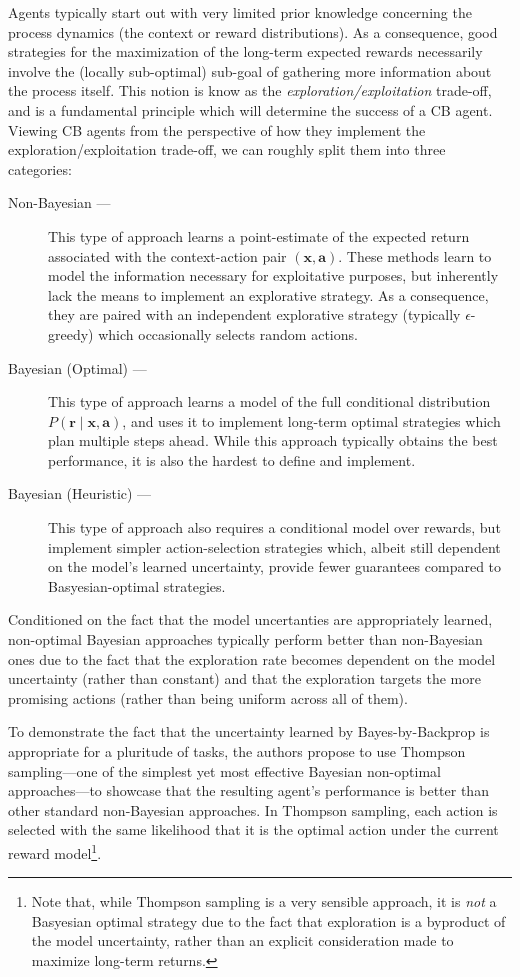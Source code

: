 \documentclass[11pt]{article}
\begin{document}
Agents typically start out with very limited prior knowledge concerning the
process dynamics (the context or reward distributions).  As a consequence, good
strategies for the maximization of the long-term expected rewards necessarily
involve the (locally sub-optimal) sub-goal of gathering more information about
the process itself.  This notion is know as the \emph{exploration/exploitation}
trade-off, and is a fundamental principle which will determine the success of
a CB agent.  Viewing CB agents from the perspective of how they implement the
exploration/exploitation trade-off, we can roughly split them into three
categories:
%
\begin{description}
  \item[Non-Bayesian ---]  This type of approach learns a point-estimate of the
    expected return associated with the context-action pair $(\bm x, \bm a)$.
    These methods learn to model the information necessary for exploitative
    purposes, but inherently lack the means to implement an explorative
    strategy.  As a consequence, they are paired with an independent
    explorative strategy (typically $\epsilon$-greedy) which occasionally
    selects random actions.
  \item[Bayesian (Optimal) ---]  This type of approach learns a model of the
    full conditional distribution $P(\bm r\mid \bm x, \bm a)$, and uses it to
    implement long-term optimal strategies which plan multiple steps ahead.
    While this approach typically obtains the best performance, it is also the
    hardest to define and implement.
  \item[Bayesian (Heuristic) ---]  This type of approach also requires
    a conditional model over rewards, but implement simpler action-selection
    strategies which, albeit still dependent on the model's learned uncertainty,
    provide fewer guarantees compared to Basyesian-optimal strategies.  
\end{description}

Conditioned on the fact that the model uncertanties are appropriately learned,
non-optimal Bayesian approaches typically perform better than non-Bayesian ones
due to the fact that the exploration rate becomes dependent on the model
uncertainty (rather than constant) and that the exploration targets the more
promising actions (rather than being uniform across all of them).

To demonstrate the fact that the uncertainty learned by Bayes-by-Backprop is
appropriate for a pluritude of tasks, the authors propose to use Thompson
sampling---one of the simplest yet most effective Bayesian non-optimal
approaches---to showcase that the resulting agent's performance is better than
other standard non-Bayesian approaches.  In Thompson sampling, each action is
selected with the same likelihood that it is the optimal action under the
current reward model\footnote{Note that, while Thompson sampling is a very
sensible approach, it is \emph{not} a Basyesian optimal strategy due to the
fact that exploration is a byproduct of the model uncertainty, rather than an
explicit consideration made to maximize long-term returns.}.  
\end{document}
